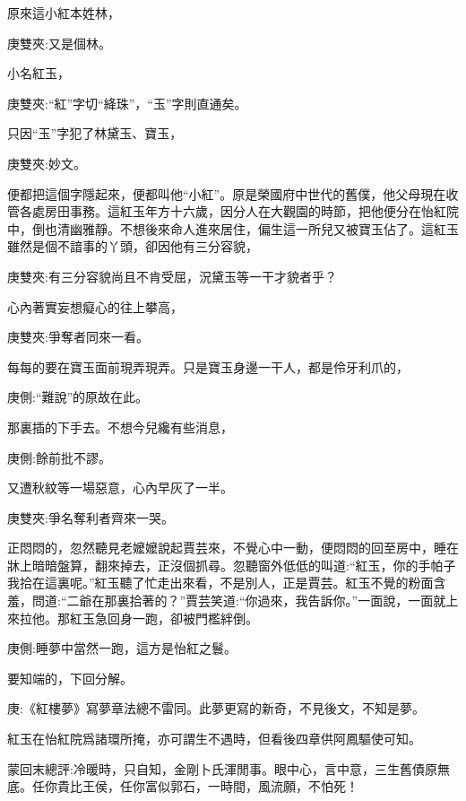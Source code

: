 \begin{parag}
    原來這小紅本姓林，\begin{note}庚雙夾:又是個林。\end{note}小名紅玉，\begin{note}庚雙夾:“紅”字切“絳珠”，“玉”字則直通矣。\end{note}只因“玉”字犯了林黛玉、寶玉，\begin{note}庚雙夾:妙文。\end{note}便都把這個字隱起來，便都叫他“小紅”。原是榮國府中世代的舊僕，他父母現在收管各處房田事務。這紅玉年方十六歲，因分人在大觀園的時節，把他便分在怡紅院中，倒也清幽雅靜。不想後來命人進來居住，偏生這一所兒又被寶玉佔了。這紅玉雖然是個不諳事的丫頭，卻因他有三分容貌，\begin{note}庚雙夾:有三分容貌尚且不肯受屈，況黛玉等一干才貌者乎？\end{note}心內著實妄想癡心的往上攀高，\begin{note}庚雙夾:爭奪者同來一看。\end{note}每每的要在寶玉面前現弄現弄。只是寶玉身邊一干人，都是伶牙利爪的，\begin{note}庚側:“難說”的原故在此。\end{note}那裏插的下手去。不想今兒纔有些消息，\begin{note}庚側:餘前批不謬。\end{note}又遭秋紋等一場惡意，心內早灰了一半。\begin{note}庚雙夾:爭名奪利者齊來一哭。\end{note}正悶悶的，忽然聽見老嬤嬤說起賈芸來，不覺心中一動，便悶悶的回至房中，睡在牀上暗暗盤算，翻來掉去，正沒個抓尋。忽聽窗外低低的叫道:“紅玉，你的手帕子我拾在這裏呢。”紅玉聽了忙走出來看，不是別人，正是賈芸。紅玉不覺的粉面含羞，問道:“二爺在那裏拾著的？”賈芸笑道:“你過來，我告訴你。”一面說，一面就上來拉他。那紅玉急回身一跑，卻被門檻絆倒。\begin{note}庚側:睡夢中當然一跑，這方是怡紅之鬟。\end{note}要知端的，下回分解。
\end{parag}


\begin{parag}
    \begin{note}庚:《紅樓夢》寫夢章法總不雷同。此夢更寫的新奇，不見後文，不知是夢。\end{note}
\end{parag}


\begin{parag}
    \begin{note}紅玉在怡紅院爲諸環所掩，亦可謂生不遇時，但看後四章供阿鳳驅使可知。\end{note}
\end{parag}


\begin{parag}
    \begin{note}蒙回末總評:冷暖時，只自知，金剛卜氏渾閒事。眼中心，言中意，三生舊債原無底。任你貴比王侯，任你富似郭石，一時間，風流願，不怕死！\end{note}
\end{parag}

